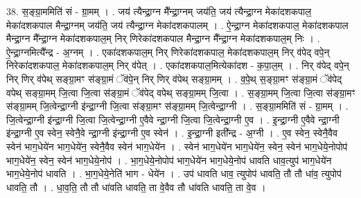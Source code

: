 \documentclass[17pt]{extarticle}
\begin{document}
38. स॒ङ्ग्रा॒ममिति॑ सं - ग्रा॒मम् । . जय॑ त्यैन्द्रा॒ग्न मै᳚न्द्रा॒ग्नम् जय॑ति॒ जय॑ त्यैन्द्रा॒ग्न मेका॑दशकपाल॒ मेका॑दशकपाल मैन्द्रा॒ग्नम् जय॑ति॒ जय॑ त्यैन्द्रा॒ग्न मेका॑दशकपालम् । . ऐ॒न्द्रा॒ग्न मेका॑दशकपाल॒ मेका॑दशकपाल मैन्द्रा॒ग्न मै᳚न्द्रा॒ग्न मेका॑दशकपाल॒म् निर् णिरेका॑दशकपाल मैन्द्रा॒ग्न मै᳚न्द्रा॒ग्न मेका॑दशकपाल॒म् निः । . ऐ॒न्द्रा॒ग्नमित्यै᳚न्द्र - अ॒ग्नम् । . एका॑दशकपाल॒म् निर् णिरेका॑दशकपाल॒ मेका॑दशकपाल॒म् निर् व॑पेद् वपे॒न् निरेका॑दशकपाल॒ मेका॑दशकपाल॒म् निर् व॑पेत् । . एका॑दशकपाल॒मित्येका॑दश - क॒पा॒ल॒म् । . निर् व॑पेद् वपे॒न् निर् णिर् व॑पेथ् सङ्ग्रा॒मꣳ स॑ङ्ग्रा॒मं ॅव॑पे॒न् निर् णिर् व॑पेथ् सङ्ग्रा॒मम् । . व॒पे॒थ् स॒ङ्ग्रा॒मꣳ स॑ङ्ग्रा॒मं ॅव॑पेद् वपेथ् सङ्ग्रा॒मम् जि॒त्वा जि॒त्वा स॑ङ्ग्रा॒मं ॅव॑पेद् वपेथ् सङ्ग्रा॒मम् जि॒त्वा । . स॒ङ्ग्रा॒मम् जि॒त्वा जि॒त्वा स॑ङ्ग्रा॒मꣳ स॑ङ्ग्रा॒मम् जि॒त्वेन्द्रा॒ग्नी इ॑न्द्रा॒ग्नी जि॒त्वा स॑ङ्ग्रा॒मꣳ स॑ङ्ग्रा॒मम् जि॒त्वेन्द्रा॒ग्नी । . स॒ङ्ग्रा॒ममिति॑ सं - ग्रा॒मम् । . जि॒त्वेन्द्रा॒ग्नी इ॑न्द्रा॒ग्नी जि॒त्वा जि॒त्वेन्द्रा॒ग्नी ए॒वैवे न्द्रा॒ग्नी जि॒त्वा जि॒त्वेन्द्रा॒ग्नी ए॒व । . इ॒न्द्रा॒ग्नी ए॒वैवे न्द्रा॒ग्नी इ॑न्द्रा॒ग्नी ए॒व स्वेन॒ स्वेनै॒वे न्द्रा॒ग्नी इ॑न्द्रा॒ग्नी ए॒व स्वेन॑ । . इ॒न्द्रा॒ग्नी इती᳚न्द्र - अ॒ग्नी । . ए॒व स्वेन॒ स्वेनै॒वैव स्वेन॑ भाग॒धेये॑न भाग॒धेये॑न॒ स्वेनै॒वैव स्वेन॑ भाग॒धेये॑न । . स्वेन॑ भाग॒धेये॑न भाग॒धेये॑न॒ स्वेन॒ स्वेन॑ भाग॒धेये॒नोपोप॑ भाग॒धेये॑न॒ स्वेन॒ स्वेन॑ भाग॒धेये॒नोप॑ । . भा॒ग॒धेये॒नोपोप॑ भाग॒धेये॑न भाग॒धेये॒नोप॑ धावति धाव॒त्युप॑ भाग॒धेये॑न भाग॒धेये॒नोप॑ धावति । . भा॒ग॒धेये॒नेति॑ भाग - धेये॑न । . उप॑ धावति धाव॒ त्युपोप॑ धावति॒ तौ तौ धा॑व॒ त्युपोप॑ धावति॒ तौ । . धा॒व॒ति॒ तौ तौ धा॑वति धावति॒ ता वे॒वैव तौ धा॑वति धावति॒ ता वे॒व । \newline
\end{document}
